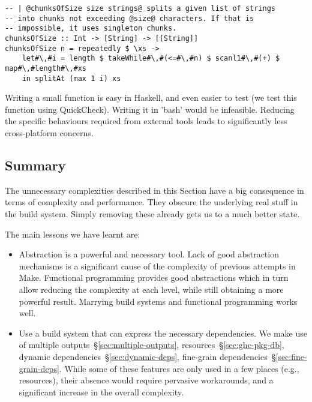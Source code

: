 \begin{lstlisting}
-- | @chunksOfSize size strings@ splits a given list of strings
-- into chunks not exceeding @size@ characters. If that is
-- impossible, it uses singleton chunks.
chunksOfSize :: Int -> [String] -> [[String]]
chunksOfSize n = repeatedly $ \xs ->
    let#\,#i = length $ takeWhile#\,#(<=#\,#n) $ scanl1#\,#(+) $ map#\,#length#\,#xs
    in splitAt (max 1 i) xs
\end{lstlisting}

\noindent Writing a small function is easy in Haskell, and even easier to test
(we test this function using QuickCheck). Writing it in \lst'bash' would be infeasible.
Reducing the specific behaviours required from external tools leads to
significantly less cross-platform concerns.

\subsection{Summary}

The unnecessary complexities described in this Section have a big consequence in
terms of complexity and performance. They obscure the underlying real stuff in
the build system. Simply removing these already gets us to a much better state.

The main lessons we have learnt are:

\begin{itemize}
\item Abstraction is a powerful and necessary tool. Lack of good abstraction
mechanisms is a significant cause of the complexity of previous attempts in
Make. Functional programming provides good abstractions which in turn allow
reducing the complexity at each level, while still obtaining a more powerful
result. Marrying build systems and functional programming works well.
\item Use a build system that can express the necessary dependencies. We make
use of multiple outputs~\S\ref{sec:multiple-outputs},
resources~\S\ref{sec:ghc-pkg-db}, dynamic dependencies~\S\ref{sec:dynamic-deps},
fine-grain dependencies~\S\ref{sec:fine-grain-deps}. While some of these
features are only used in a few places (e.g., resources), their absence would
require pervasive workarounds, and a significant increase in the overall complexity.
\end{itemize}

